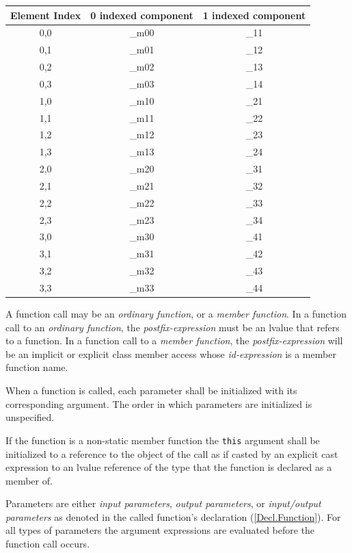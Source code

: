 \begin{center}
  \begin{tabular}{|| c | c | c ||}
    \hline
    Element Index & 0 indexed component & 1 indexed component \\
    \hline
    0,0 & \_m00 & \_11 \\
    0,1 & \_m01 & \_12 \\
    0,2 & \_m02 & \_13 \\
    0,3 & \_m03 & \_14 \\
    1,0 & \_m10 & \_21 \\
    1,1 & \_m11 & \_22 \\
    1,2 & \_m12 & \_23 \\
    1,3 & \_m13 & \_24 \\
    2,0 & \_m20 & \_31 \\
    2,1 & \_m21 & \_32 \\
    2,2 & \_m22 & \_33 \\
    2,3 & \_m23 & \_34 \\
    3,0 & \_m30 & \_41 \\
    3,1 & \_m31 & \_42 \\
    3,2 & \_m32 & \_43 \\
    3,3 & \_m33 & \_44 \\
    \hline
  \end{tabular}
\end{center}


\p A function call may be an \textit{ordinary function}, or a \textit{member
function}. In a function call to an \textit{ordinary function}, the
\textit{postfix-expression} must be an lvalue that refers to a function. In a
function call to a \textit{member function}, the \textit{postfix-expression}
will be an implicit or explicit class member access whose \textit{id-expression}
is a member function name.

\p When a function is called, each parameter shall be initialized with its
corresponding argument. The order in which parameters are initialized is
unspecified.

\p If the function is a non-static member function the \texttt{this} argument
shall be initialized to a reference to the object of the call as if casted by an
explicit cast expression to an lvalue reference of the type that the function is
declared as a member of.

\p Parameters are either \textit{input parameters}, \textit{output parameters},
or \textit{input/output parameters} as denoted in the called function's
declaration (\ref{Decl.Function}). For all types of parameters the argument
expressions are evaluated before the function call occurs.

